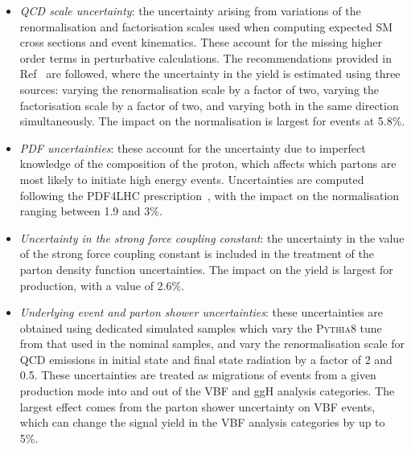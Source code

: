 \begin{itemize}
\item \textit{QCD scale uncertainty}:  
  the uncertainty arising from variations of the renormalisation and factorisation scales used when computing expected SM cross sections and event kinematics.
  These account for the missing higher order terms in perturbative calculations.
  The recommendations provided in Ref~\cite{YR4} are followed, where the uncertainty in the yield is estimated using three sources: varying the renormalisation scale by a factor of two, varying the factorisation scale by a factor of two, and varying both in the same direction simultaneously.
  The impact on the normalisation is largest for \ttH events at 5.8\%. %
\item \textit{PDF uncertainties}:
  these account for the uncertainty due to imperfect knowledge of the composition of the proton, which affects which partons are most likely to initiate high energy events.
  Uncertainties are computed following the PDF4LHC prescription~\cite{PDF4LHC,YR3}, with the impact on the normalisation ranging between 1.9 and 3\%.
\item \textit{Uncertainty in the strong force coupling constant}:
  the uncertainty in the value of the strong force coupling constant is included in the treatment of the parton density function uncertainties.
  The impact on the yield is largest for \ggH production, with a value of 2.6\%.
\item \textit{Underlying event and parton shower uncertainties}:
  these uncertainties are obtained using dedicated simulated samples which vary the \textsc{Pythia8} tune from that used in the nominal samples, and vary the renormalisation scale for QCD emissions in initial state and final state radiation by a factor of 2 and 0.5. These uncertainties are treated as migrations of events from a given production mode into and out of the VBF and ggH analysis categories. The largest effect comes from the parton shower uncertainty on VBF events, which can change the signal yield in the VBF analysis categories by up to 5\%. 
\end{itemize}

